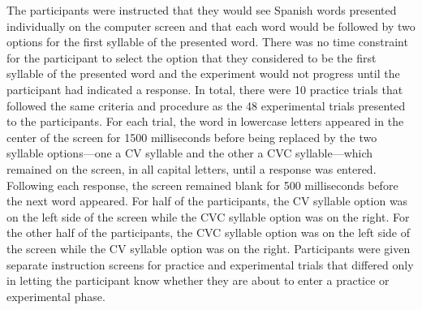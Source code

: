 \documentclass[
12pt, %
english, %
doublespacing, %
nolistspacing, %
liststotoc, %
headsepline, %
chapterinoneline, %
openany, %
]{DoctoralThesis}\usepackage[]{graphicx}\usepackage[]{color}
\begin{document}
The participants were instructed that they would see Spanish words presented individually on the computer screen and that each word would be followed by two options for the first syllable of the presented word. There was no time constraint for the participant to select the option that they considered to be the first syllable of the presented word and the experiment would not progress until the participant had indicated a response. %
In total, there were 10 practice trials that followed the same criteria and procedure as the 48 experimental trials presented to the participants. %
For each trial, the word in lowercase letters appeared in the center of the screen for 1500 milliseconds before being replaced by the two syllable options---one a CV syllable and the other a CVC syllable---which remained on the screen, in all capital letters, until a response was entered. Following each response, the screen remained blank for 500 milliseconds before the next word appeared. %
For half of the participants, the CV syllable option was on the left side of the screen while the CVC syllable option was on the right. For the other half of the participants, the CVC syllable option was on the left side of the screen while the CV syllable option was on the right. Participants were given separate instruction screens for practice and experimental trials that differed only in letting the participant know whether they are about to enter a practice or experimental phase. %

\end{document}
